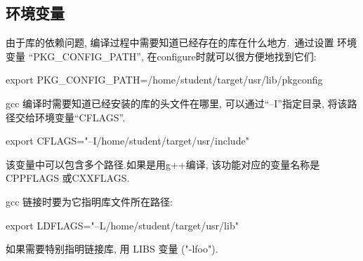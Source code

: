\subsection{环境变量}
    由于库的依赖问题, 编译过程中需要知道已经存在的库在什么地方.~通过设置
环境变量 ``PKG\_CONFIG\_PATH'', 在configure时就可以很方便地找到它们:

    export PKG\_CONFIG\_PATH=/home/student/target/usr/lib/pkgconfig

    gcc 编译时需要知道已经安装的库的头文件在哪里, 可以通过``--I''指定目录,
将该路径交给环境变量``CFLAGS''.

    export CFLAGS="--I/home/student/target/usr/include"

    该变量中可以包含多个路径.如果是用g++编译, 该功能对应的变量名称是CPPFLAGS
或CXXFLAGS.\@

    gcc 链接时要为它指明库文件所在路径: 

    export LDFLAGS="--L/home/student/target/usr/lib"

    如果需要特别指明链接库, 用 LIBS 变量 ("-lfoo").
